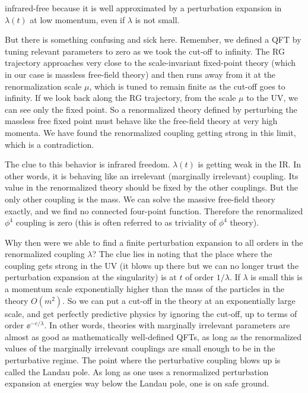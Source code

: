 infrared-free because it is well approximated by a perturbation expansion in
$\lambda(t)$ at low momentum, even if $\lambda$ is not small.

But there is something confusing and sick here. Remember, we defined a QFT by
tuning relevant parameters to zero as we took the cut-off to infinity. The RG
trajectory approaches very close to the scale-invariant fixed-point theory
(which in our case is massless free-field theory) and then runs away from it at
the renormalization scale $\mu$, which is tuned to remain finite as the cut-off
goes to infinity. If we look back along the RG trajectory, from the scale $\mu$
to the UV, we can see only the fixed point. So a renormalized theory defined by
perturbing the massless free fixed point must behave like the free-field theory
at very high momenta. We have found the renormalized coupling getting strong in
this limit, which is a contradiction.

The clue to this behavior is infrared freedom. $\lambda(t)$ is getting weak in
the IR. In other words, it is behaving like an irrelevant (marginally
irrelevant) coupling. Its value in the renormalized theory should be fixed by the
other couplings. But the only other coupling is the mass. We can solve the
massive free-field theory exactly, and we find no connected four-point function.
Therefore the renormalized $\phi^4$ coupling is zero (this is often referred to
as triviality of $\phi^4$ theory).

Why then were we able to find a finite perturbation expansion to all orders in
the renormalized coupling $\lambda$? The clue lies in noting that the place
where the coupling gets strong in the UV (it blows up there but we can no longer
trust the perturbation expansion at the singularity) is at $t$ of order
$1/\lambda$. If $\lambda$ is small this is a momentum scale exponentially higher
than the mass of the particles in the theory $O(m^2)$. So we can put a cut-off
in the theory at an exponentially large scale, and get perfectly predictive
physics by ignoring the cut-off, up to terms of order $\ee^{-c/\lambda}$. In
other words, theories with marginally irrelevant parameters are almost as good
as mathematically well-defined QFTs, as long as the renormalized values of the
marginally irrelevant couplings are small enough to be in the perturbative
regime. The point where the perturbative coupling blows up is called the Landau
pole. As long as one uses a renormalized perturbation expansion at energies way
below the Landau pole, one is on safe ground.

